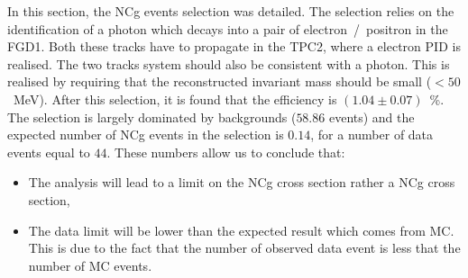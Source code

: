 
In this section, the \Gls{NCg} events selection was detailed. The
selection relies on the identification of a photon which decays into a
pair of electron~/~positron in the \Gls{FGD}1. Both these tracks have
to propagate in the \Gls{TPC}2, where a electron \Gls{PID} is
realised. The two tracks system should also be consistent with a
photon. This is realised by requiring that the reconstructed invariant
mass should be small ($<50$~MeV). After this selection, it is found
that the efficiency is $(1.04 \pm 0.07)$~\%. The selection is largely
dominated by backgrounds ($58.86$ events) and the expected number of
\Gls{NCg} events in the selection is $0.14$, for a number of data
events equal to $44$. These numbers allow us to conclude that:
\begin{itemize}[noitemsep,topsep=0pt]
\item The analysis will lead to a limit on the \Gls{NCg} cross section
  rather a \Gls{NCg} cross section,
\item The data limit will be lower than the expected result which
  comes from \Gls{MC}. This is due to the fact that the number of
  observed data event is less that the number of \Gls{MC} events.
\end{itemize}










